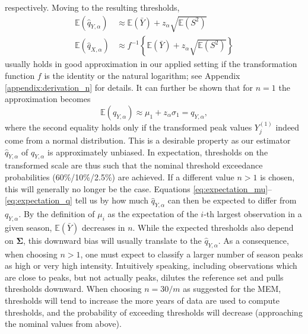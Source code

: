 \documentclass{article}
\newcommand{\sd}{s}
\newcommand{\mean}{\bar{y}}
\begin{document}
respectively. Moving to the resulting thresholds,
\begin{align}
\mathbb{E}(\hat{q}_{Y, \alpha}) & \approx \mathbb{E}(\bar{Y}) + z_\alpha \sqrt{\mathbb{E}(S^2)}
\label{eq:expectation_q}\\
\mathbb{E}(\hat{q}_{X, \alpha}) & \approx f^{-1}\left\{\mathbb{E}(\bar{Y}) + z_\alpha \sqrt{\mathbb{E}(S^2)}\right\}
\label{eq:expectation_q2}
\end{align}
usually holds in good approximation in our applied setting if the transformation function $f$ is the identity or the natural logarithm; see Appendix \ref{appendix:derivation_n} for details. It can further be shown that for $n = 1$ the approximation becomes
$$
\mathbb{E}(\hat{q}_{Y, \alpha}) \approx \mu_1 + z_\alpha \sigma_1 = q_{Y, \alpha},
$$
where the second equality holds only if the transformed peak values $Y_{j}^{(1)}$ indeed come from a normal distribution.  This is a desirable property as our estimator $\hat{q}_{Y, \alpha}$ of $q_{Y, \alpha}$ is approximately unbiased. In expectation, thresholds on the transformed scale are thus such that the nominal threshold exceedance probabilities (60\%/10\%/2.5\%) are achieved. If a different value $n > 1$ is chosen, this will generally no longer be the case. Equations \eqref{eq:expectation_mu}--\eqref{eq:expectation_q} tell us by how much $\hat{q}_{Y, \alpha}$ can then be expected to differ from $q_{Y, \alpha}$. By the definition of $\mu_i$ as the expectation of the $i$-th largest observation in a given season, $\mathbb{E}(\bar{Y})$ decreases in $n$. While the expected thresholds also depend on $\mathbf{\Sigma}$, this downward bias will usually translate to the $\hat{q}_{Y, \alpha}$. As a consequence, when choosing $n > 1$, one must expect to classify a larger number of season peaks as high or very high intensity. Intuitively speaking, including observations which are close to peaks, but not actually peaks, dilutes the reference set and pulls thresholds downward. When choosing $n = 30/m$ as suggested for the MEM, thresholds will tend to increase the more years of data are used to compute thresholds, and the probability of exceeding thresholds will decrease (approaching the nominal values from above). 
\end{document}
